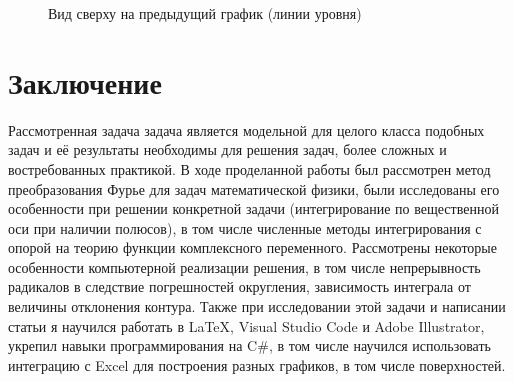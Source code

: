 \documentclass[a4paper, 12pt]{article}
\begin{document}
        \begin{figure}[h!]
            \noindent{}
            \caption{Вид сверху на предыдущий график (линии уровня)}
            \label{figCurves}
            \end{figure}        

\section*{Заключение}
Рассмотренная задача задача является модельной для целого класса подобных задач и её результаты необходимы для решения задач, более сложных и востребованных практикой.
В ходе проделанной работы был рассмотрен метод преобразования Фурье для задач математической физики, были исследованы его особенности при решении конкретной задачи (интегрирование по вещественной оси при наличии полюсов), в том числе численные методы интегрирования с опорой на теорию функции комплексного переменного.
Рассмотрены некоторые особенности компьютерной реализации решения, в том числе непрерывность радикалов в следствие погрешностей округления, зависимость интеграла от величины отклонения контура.
Также при исследовании этой задачи и написании статьи я научился работать в \LaTeX, Visual Studio Code и Adobe Illustrator, укрепил навыки программирования на C$\#$, в том числе научился использовать интеграцию с Excel для построения разных графиков, в том числе поверхностей.
\end{document}
